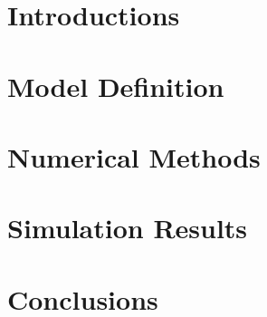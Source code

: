 \documentclass[12pt]{report}
\theoremstyle{plain}
\begin{document}



\setcounter{page}{3}
%
%
\setlength{\parskip}{0ex plus 0.5ex minus 0.2ex}

\tableofcontents
\pagebreak
\setlength{\parskip}{10pt}


\pagebreak
\pagestyle{normal}
\doublespacing

\chapter{Introductions}



\chapter{Model Definition}
%


\chapter{Numerical Methods}




\pagestyle{chp3-5}

\pagestyle{normal}
\chapter{Simulation Results}



\chapter{Conclusions}




\newpage
\pagestyle{References}
\end{document}
